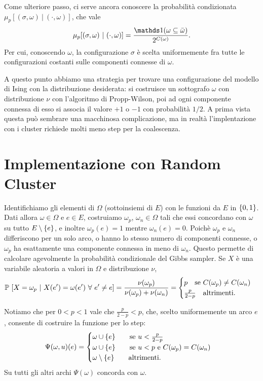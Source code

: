 \documentclass[]{marticle}
\begin{document}
Come ulteriore passo, ci serve ancora conoscere la probabilit\`a condizionata
$\mu_p[(\sigma,\omega)\ |\ (\cdot,\omega)]$, che vale 
\[
    \mu_p[(\sigma,\omega)\ |\ (\cdot,\omega)]
    = \frac{\ind(\omega \subseteq \bar{\omega})} {2^{C(\omega)}}.
\]
Per cui, conoscendo $\omega$, la configurazione $\sigma$ \`e scelta
uniformemente fra tutte le configurazioni costanti sulle componenti connesse di
$\omega$.

A questo punto abbiamo una strategia per trovare una configurazione del modello
di Ising con la distribuzione desiderata: si costruisce un sottografo $\omega$
con distribuzione $\nu$ con l'algoritmo di Propp-Wilson, poi ad ogni componente
connessa di esso si associa il valore $+1$ o $-1$ con probabilit\`a $1/2$. A
prima vista questa pu\`o sembrare una macchinosa complicazione, ma in realt\`a
l'implentazione con i cluster richiede molti meno step per la coalescenza.

\section{Implementazione con Random Cluster}

Identifichiamo gli elementi di $\Omega$ (sottoinsiemi di $E$) con le funzioni da
$E$ in  $\{0,1\}$. Dati allora $\omega\in\Omega$ e $e\in E$, costruiamo
$\omega_p$, $\omega_n\in\Omega$ tali che essi concordano con $\omega$ su tutto
$E \setminus \{e\}$, e inoltre $\omega_p(e) = 1$ mentre $\omega_n(e)=0$. 
Poich\`e $\omega_p$ e $\omega_n$ differiscono per un solo arco, o hanno lo
stesso numero di componenti connesse, o $\omega_p$ ha esattamente una componente
connessa in meno di $\omega_n$. Questo permette di calcolare agevolmente la
probabilit\`a condizionale del Gibbs sampler. Se $X$ \`e una variabile aleatoria
a valori in $\Omega$ e distribuzione $\nu$,
\[
    \prob{X=\omega_p \ |\ X(e')=\omega(e') \ \forall e' \neq e} = 
    \frac{\nu(\omega_p)}{\nu(\omega_p)+\nu(\omega_n)} = 
    \begin{cases}
        p \text{\quad se $C(\omega_p) \neq C(\omega_n)$}\\
        \frac{p}{2-p} \text{\quad altrimenti}.
    \end{cases}
\]

Notiamo che per $0<p<1$ vale che $\frac{p}{2-p}<p$, che, scelto uniformemente un
arco $e$, consente di costruire la funzione per lo step:
\[
    \Psi(\omega,u)(e) =
    \begin{cases}
        \omega \cup \{e\} \text{\qquad se $u<\frac{p}{2-p}$}\\
        \omega \cup \{e\} \text{\qquad se $u<p$ e $C(\omega_p) =
            C(\omega_n)$}\\
        \omega \setminus \{e\} \text{\qquad altrimenti.} 

    \end{cases}
\]
Su tutti gli altri archi $\Psi(\omega)$ concorda con $\omega$.
\end{document}
